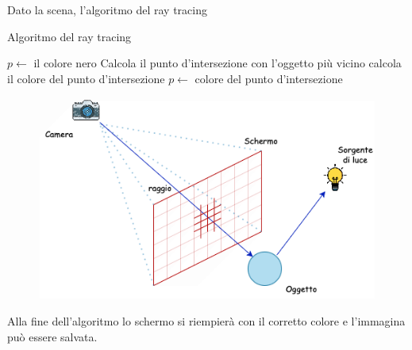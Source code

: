 \documentclass[9pt,a4paper,twoside]{tau}
\begin{document}
Dato la scena, l'algoritmo del ray tracing 
\begin{algorithm}
  \caption{Algoritmo del ray tracing}\label{r_t}
  \begin{algorithmic}
        \State $p \leftarrow$ il colore nero 
         	\State Calcola il punto d'intersezione con l'oggetto più vicino
         		\State calcola il colore del punto d'intersezione
         		\State $ p \leftarrow$  colore del punto d'intersezione
         	\EndIf	
        \EndIf
    \EndFor
  \end{algorithmic}
\end{algorithm}

\begin{figure}[H]
    \centering
    \includegraphics[width=0.7\columnwidth]{Figures/15.png}
    \caption{}
    \label{fig:figure}
\end{figure}

Alla fine dell'algoritmo lo schermo si riempierà con il corretto colore e l'immagina può essere salvata.
\end{document}
